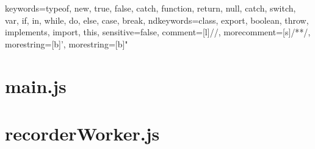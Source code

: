 {
  keywords={typeof, new, true, false, catch, function, return, null, catch, switch, var, if, in, while, do, else, case, break},
  ndkeywords={class, export, boolean, throw, implements, import, this},
  sensitive=false,
  comment=[l]{//},
  morecomment=[s]{/*}{*/},
  morestring=[b]',
  morestring=[b]"
}

	\section{main.js}
	
	
	
	
	\section{recorderWorker.js}
	